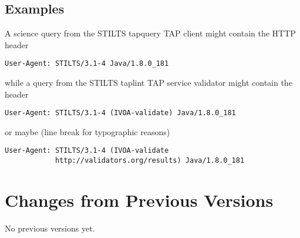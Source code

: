 \documentclass[11pt,a4paper]{ivoa}
\begin{document}
\subsection{Examples}

A science query from the STILTS tapquery TAP client might contain the
HTTP header
\begin{lstlisting}
User-Agent: STILTS/3.1-4 Java/1.8.0_181
\end{lstlisting}
while a query from the STILTS taplint TAP service validator might
contain the header
\begin{lstlisting}
User-Agent: STILTS/3.1-4 (IVOA-validate) Java/1.8.0_181
\end{lstlisting}
or maybe (line break for typographic reasons)
\begin{lstlisting}
User-Agent: STILTS/3.1-4 (IVOA-validate
            http://validators.org/results) Java/1.8.0_181
\end{lstlisting}

\appendix
\section{Changes from Previous Versions}

No previous versions yet.  



\end{document}

